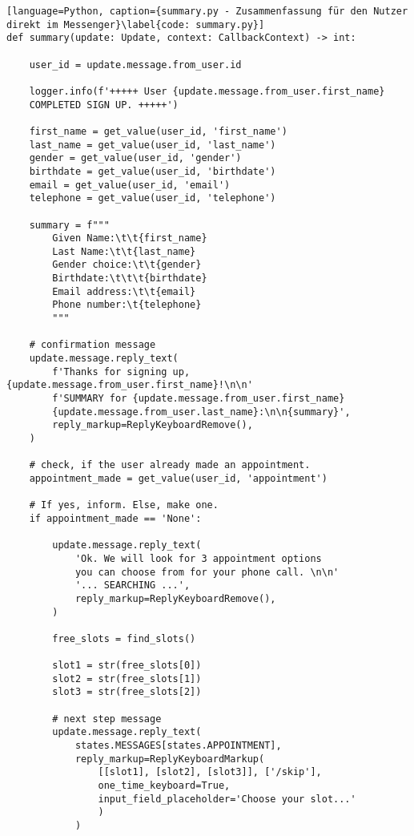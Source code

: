             \begin{lstlisting}[language=Python, caption={summary.py - Zusammenfassung für den Nutzer direkt im Messenger}\label{code: summary.py}]
def summary(update: Update, context: CallbackContext) -> int:
    
    user_id = update.message.from_user.id    

    logger.info(f'+++++ User {update.message.from_user.first_name} 
    COMPLETED SIGN UP. +++++')

    first_name = get_value(user_id, 'first_name')
    last_name = get_value(user_id, 'last_name')
    gender = get_value(user_id, 'gender')
    birthdate = get_value(user_id, 'birthdate')
    email = get_value(user_id, 'email')
    telephone = get_value(user_id, 'telephone')

    summary = f"""
        Given Name:\t\t{first_name}
        Last Name:\t\t{last_name}
        Gender choice:\t\t{gender}
        Birthdate:\t\t\t{birthdate}
        Email address:\t\t{email}
        Phone number:\t{telephone}
        """

    # confirmation message
    update.message.reply_text(
        f'Thanks for signing up, {update.message.from_user.first_name}!\n\n'
        f'SUMMARY for {update.message.from_user.first_name} 
        {update.message.from_user.last_name}:\n\n{summary}',
        reply_markup=ReplyKeyboardRemove(),
    )
    
    # check, if the user already made an appointment. 
    appointment_made = get_value(user_id, 'appointment')
    
    # If yes, inform. Else, make one.
    if appointment_made == 'None':
        
        update.message.reply_text(
            'Ok. We will look for 3 appointment options 
            you can choose from for your phone call. \n\n'
            '... SEARCHING ...',
            reply_markup=ReplyKeyboardRemove(),
        )

        free_slots = find_slots()

        slot1 = str(free_slots[0])
        slot2 = str(free_slots[1])
        slot3 = str(free_slots[2])

        # next step message
        update.message.reply_text(
            states.MESSAGES[states.APPOINTMENT],
            reply_markup=ReplyKeyboardMarkup(
                [[slot1], [slot2], [slot3]], ['/skip'], 
                one_time_keyboard=True, 
                input_field_placeholder='Choose your slot...'
                )
            )


\end{lstlisting}
